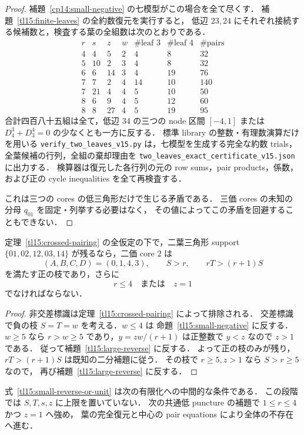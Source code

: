\begin{proof}
補題~\ref{cp14:small-negative} の七模型がこの場合を全て尽くす．
補題~\ref{tl15:finite-leaves} の全約数復元を実行すると，
低辺 $23,24$ にそれぞれ接続する候補数と，検査する葉の全組数は次のとおりである．
\[
\begin{array}{rrrr|rr|r}
 r&s&z&w&\#\text{leaf }3&\#\text{leaf }4&\#\text{pairs}\\\hline
 4&4&5&2&4&8&32\\
 5&10&2&3&4&8&32\\
 6&6&14&3&4&19&76\\
 7&7&2&4&14&10&140\\
 7&21&4&4&5&10&50\\
 8&6&9&4&5&12&60\\
 8&8&27&4&5&19&95
\end{array}
\]
合計四百八十五組は全て，低辺 $34$ の三つの node 区間
$[-4,1]$ または $D^3_4+D^4_3=0$ の少なくとも一方に反する．
標準 library の整数・有理数演算だけを用いる
\nolinkurl{verify_two_leaves_v15.py} は，七模型を生成する完全な約数 trials，
全葉候補の行列，全組の棄却理由を
\nolinkurl{two_leaves_exact_certificate_v15.json} に出力する．
検算器は復元した各行列の元の row sums，pair products，係数，
および正の cycle inequalities を全て再検査する．

これは三つの cores の低三角形だけで生じる矛盾である．
三価 cores の未知の分母 $q_{01}$ を固定・列挙する必要はなく，
その値によってこの矛盾を回避することもできない．
\end{proof}

\begin{theorem}
\label{tl15:remaining-positive}
定理~\ref{tl15:crossed-pairing} の全仮定の下で，二葉三角形 support
$\{01,02,12,03,14\}$ が残るなら，二価 core $2$ は
\[
 (A,B,C,D)=(0,1,4,3),\qquad S>r,\qquad rT>(r+1)S
\]
を満たす正の枝であり，さらに
\begin{equation}\label{tl15:small-reverse-or-unit}
 r\le4\quad\text{または}\quad z=1
\end{equation}
でなければならない．
\end{theorem}

\begin{proof}
非交差標識は定理~\ref{tl15:crossed-pairing} によって排除される．
交差標識で負の枝 $S=T=w$ を考える．$w\le4$ は
命題~\ref{tl15:small-negative} に反する．$w\ge5$ なら
$r>w\ge5$ であり，$y=zw/(r+1)$ は正整数で $y<z$ なので $z>1$ である．
従って補題~\ref{tl15:large-reverse} に反する．
よって正の枝のみが残り，$rT>(r+1)S$ は既知の二分補題に従う．
その枝で $r\ge5,z>1$ なら $S>r\ge5$ なので，
再び補題~\ref{tl15:large-reverse} に反する．
\end{proof}

式~\eqref{tl15:small-reverse-or-unit} は次の有限化への中間的な条件である．
この段階では $S,T,s,z$ に上限を置いていない．
次の共通低 puncture の補題で $1\le r\le4$ かつ $z=1$ へ強め，
葉の完全復元と中心の pair equations により全体の不存在へ進む．
